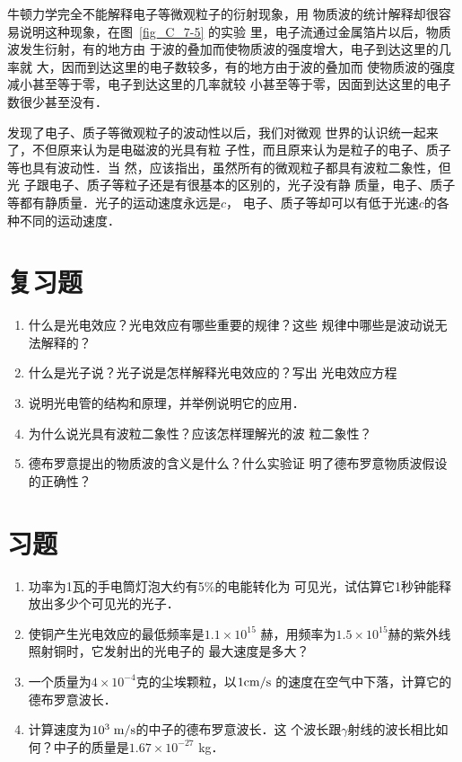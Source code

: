 牛顿力学完全不能解释电子等微观粒子的衍射现象，用
物质波的统计解释却很容易说明这种现象，在图~\ref{fig_C_7-5} 的实验
里，电子流通过金属箔片以后，物质波发生衍射，有的地方由
于波的叠加而使物质波的强度增大，电子到达这里的几率就
大，因而到达这里的电子数较多，有的地方由于波的叠加而
使物质波的强度减小甚至等于零，电子到达这里的几率就较
小甚至等于零，因面到达这里的电子数很少甚至没有．

发现了电子、质子等微观粒子的波动性以后，我们对微观
世界的认识统一起来了，不但原来认为是电磁波的光具有粒
子性，而且原来认为是粒子的电子、质子等也具有波动性．当
然，应该指出，虽然所有的微观粒子都具有波粒二象性，但光
子跟电子、质子等粒子还是有很基本的区别的，光子没有静
质量，电子、质子等都有静质量．光子的运动速度永远是$c$，
电子、质子等却可以有低于光速$c$的各种不同的运动速度．

\section*{复习题}
\begin{enumerate}
\item 什么是光电效应？光电效应有哪些重要的规律？这些
规律中哪些是波动说无法解释的？
\item 什么是光子说？光子说是怎样解释光电效应的？写出
光电效应方程
\item 说明光电管的结构和原理，并举例说明它的应用．
\item 为什么说光具有波粒二象性？应该怎样理解光的波
粒二象性？
\item 德布罗意提出的物质波的含义是什么？什么实验证
明了德布罗意物质波假设的正确性？
\end{enumerate}

\section*{习题}
\begin{enumerate}
    \item 功率为1瓦的手电筒灯泡大约有5\%的电能转化为
可见光，试估算它1秒钟能释放出多少个可见光的光子．
\item 使铜产生光电效应的最低频率是$1.1\times10^{15}$
赫，用频率为$1.5\times10^{15}$赫的紫外线照射铜时，它发射出的光电子的
最大速度是多大？
\item 一个质量为$4\times10^{-4}$克的尘埃颗粒，以$1{\rm cm}/{\rm s}$
的速度在空气中下落，计算它的德布罗意波长．
\item 计算速度为$10^3\;\text{m}/\text{s}$的中子的德布罗意波长．这
个波长跟$\gamma$射线的波长相比如何？中子的质量是$1.67\times10^{-27}$
kg．
\end{enumerate}



